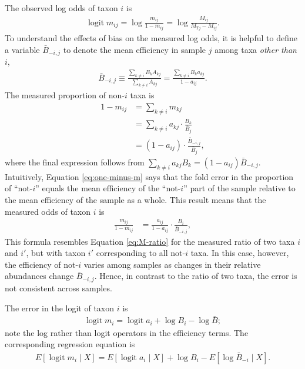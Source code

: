 \documentclass[
]{article}
\theoremstyle{definition}
\theoremstyle{definition}
\theoremstyle{definition}
\theoremstyle{definition}
\theoremstyle{remark}
\begin{document}
The observed log odds of taxon \(i\) is
\begin{align}
  \operatorname{logit} m_{ij} 
  = \log \frac{m_{ij}}{1 - m_{ij}}
  = \log \frac{M_{ij}}{M_{Tj} - M_{ij}}.
\end{align}
To understand the effects of bias on the measured log odds, it is helpful to define a variable \(\bar B_{-i,j}\) to denote the mean efficiency in sample \(j\) among
taxa \emph{other than \(i\)},
\begin{align}
  \label{eq:mean-efficiency-not-i}
  \bar B_{-i,j} 
  \equiv \frac{\sum_{k \ne i} B_k A_{kj}}{\sum_{k \ne i} A_{kj}}
  = \frac{\sum_{k \ne i} B_k a_{kj}}{1 - a_{ij}}.
\end{align}
The measured proportion of non-\(i\) taxa is
\begin{align}
  \label{eq:one-minus-m}
  1 - m_{ij}
  &= \sum_{k \ne i} m_{kj}
\\&= \sum_{k \ne i} a_{kj} \cdot \frac{B_k}{\bar B_j}
\\&= (1 - a_{ij}) \cdot \frac{\bar B_{-i,j}}{\bar B_j},
\end{align}
where the final expression follows from \(\sum_{k\ne i} a_{kj} B_k = (1-a_{ij}) \bar B_{-i,j}\).
Intuitively, Equation \eqref{eq:one-minus-m} says that the fold error in the proportion of ``not-\(i\)'' equals the mean efficiency of the ``not-\(i\)'' part of the sample relative to the mean efficiency of the sample as a whole.
This result means that the measured odds of taxon \(i\) is
\begin{align}
  \label{eq:m-odds}
  \frac{m_{ij}}{1 - m_{ij}}
  &= \frac{a_{ij}}{1 - a_{ij}} \cdot \frac{B_i}{\bar B_{-i,j}},
\end{align}
This formula resembles Equation \eqref{eq:M-ratio} for the measured ratio of two taxa \(i\) and \(i'\), but with taxon \(i'\) corresponding to all not-\(i\) taxa.
In this case, however, the efficiency of not-\(i\) varies among samples as changes in their relative abundances change \(\bar B_{-i, j}\).
Hence, in contrast to the ratio of two taxa, the error is not consistent across samples.

The error in the logit of taxon \(i\) is
\begin{align}
  \label{eq:m-logit}
  \operatorname{logit} m_i = \operatorname{logit} a_i + \log B_i - \log \bar B;
\end{align}
note the log rather than logit operators in the efficiency terms.
The corresponding regression equation is
\begin{align}
  \label{eq:m-logit-regression}
  E [\operatorname{logit} m_i \mid X] 
  = E [\operatorname{logit} a_i \mid X] + \log B_i - E [\log \bar B_{-i} \mid X].
\end{align}
\end{document}

